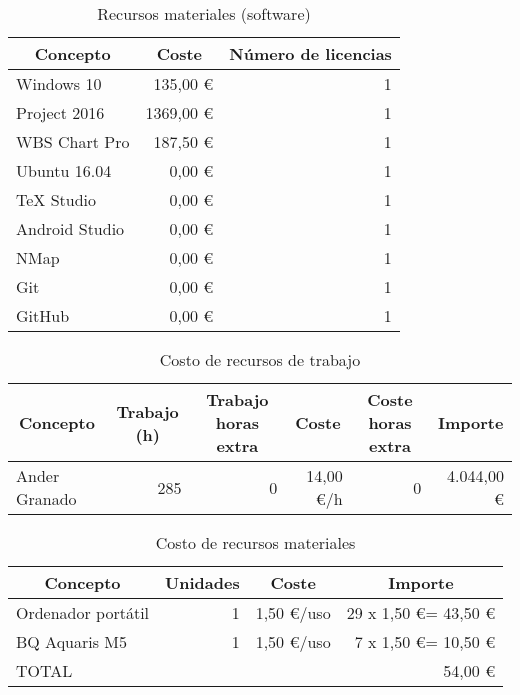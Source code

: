 \begin{table}[H]
	\centering
	\begin{tabular}{ |l|r|r| } 
		\hline
		\multicolumn{1}{|c|}{Concepto} & 
			\multicolumn{1}{|c|}{Coste} & 
				\multicolumn{1}{|c|}{Número de licencias} \\
		\hline
		Windows 10 		& 135,00 \euro \cite{precio-win10} 		& 1 \\
		Project 2016 	& 1369,00 \euro \cite{precio-project} 	& 1 \\
		WBS Chart Pro 	& 187,50 \euro \cite{precio-wbs} 		& 1 \\
		Ubuntu 16.04 	& 0,00 \euro 							& 1 \\
		TeX Studio 		& 0,00 \euro							& 1 \\
		Android Studio 	& 0,00 \euro 							& 1 \\
		NMap 			& 0,00 \euro 							& 1 \\
		Git 			& 0,00 \euro 							& 1 \\
		GitHub 			& 0,00 \euro 							& 1 \\
		\hline
	\end{tabular}
	\caption{Recursos materiales (software)}
	\label{table:recursos-software}
\end{table}

\begin{table}[H]
	\centering
	\begin{tabular}{ |l|r|r|r|r|r| } 
		\hline
		\multicolumn{1}{|c|}{Concepto} & 
			\multicolumn{1}{|c|}{Trabajo (h)} & 
				\multicolumn{1}{|c|}{Trabajo horas extra} & 
					\multicolumn{1}{|c|}{Coste} & 
						\multicolumn{1}{|c|}{Coste horas extra} & 
							\multicolumn{1}{|c|}{Importe} \\
		\hline
		Ander Granado & 285 & 0 & 14,00 \euro/h & 0 & 4.044,00 \euro \\
		\hline
	\end{tabular}
	\caption{Costo de recursos de trabajo}
	\label{table:costo-recursos-trabajo}
\end{table}

\begin{table}[H]
	\centering
	\begin{tabular}{ |l|r|r|r| } 
		\hline
		\multicolumn{1}{|c|}{Concepto} & 
			\multicolumn{1}{|c|}{Unidades} & 
				\multicolumn{1}{|c|}{Coste} & 
					\multicolumn{1}{|c|}{Importe} \\
		\hline
		Ordenador portátil 	& 1 & 1,50 \euro/uso & 29 x 1,50 \euro \space= 43,50 \euro	\\
		BQ Aquaris M5 		& 1 & 1,50 \euro/uso & 7 x 1,50 \euro \space= 10,50 \euro	\\
		\hline
		\multicolumn{3}{|l}{TOTAL} & \multicolumn{1}{r|}{54,00 \euro} \\ 
		\hline
	\end{tabular}
	\caption{Costo de recursos materiales}
	\label{table:costo-recursos-materiales}
\end{table}


